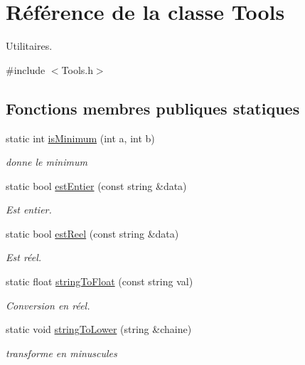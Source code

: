 \hypertarget{class_tools}{
\section{Référence de la classe Tools}
\label{class_tools}
}


Utilitaires.  




{\ttfamily \#include $<$Tools.h$>$}

\subsection*{Fonctions membres publiques statiques}
\begin{DoxyCompactItemize}
\item 
static int \hyperlink{class_tools_a1091376013e416681e90155ed87e977c}{isMinimum} (int a, int b)
\begin{DoxyCompactList}\small\item\em donne le minimum \item\end{DoxyCompactList}\item 
static bool \hyperlink{class_tools_a3b88f4e98469dd9d4cefcd0525aecde7}{estEntier} (const string \&data)
\begin{DoxyCompactList}\small\item\em Est entier. \item\end{DoxyCompactList}\item 
static bool \hyperlink{class_tools_ac293cf13e99e6d5739a5039cefa8753e}{estReel} (const string \&data)
\begin{DoxyCompactList}\small\item\em Est réel. \item\end{DoxyCompactList}\item 
static float \hyperlink{class_tools_a07892ec493ca75d5de5fbd01b1a7a223}{stringToFloat} (const string val)
\begin{DoxyCompactList}\small\item\em Conversion en réel. \item\end{DoxyCompactList}\item 
static void \hyperlink{class_tools_a53e25a53c9f01b0a7e5b3af7673d881d}{stringToLower} (string \&chaine)
\begin{DoxyCompactList}\small\item\em transforme en minuscules \item\end{DoxyCompactList}\item 

\end{DoxyCompactItemize}
